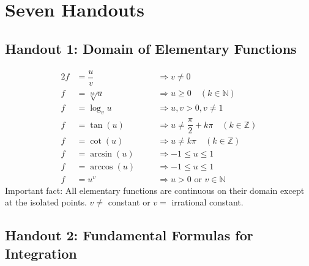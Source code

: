 \chapter*{Seven Handouts}
\section{Handout 1: Domain of Elementary Functions}

\begin{alignat*}{2}
    f &= \dfrac{u}{v} &\quad &\Rightarrow v \neq 0 \\
    f &= \sqrt[2k]{u} &\quad &\Rightarrow u \geq 0 \quad (k \in \mathbb{N}) \\
    f &= \log_{v}{u} &\quad &\Rightarrow u, v > 0, v \neq 1 \\
    f &= \tan(u) &\quad &\Rightarrow u \neq \dfrac{\pi}{2} + k\pi \quad (k \in \mathbb{Z}) \\
    f &= \cot(u) &\quad &\Rightarrow u \neq k\pi \quad (k \in \mathbb{Z}) \\
    f &= \arcsin(u) &\quad &\Rightarrow -1 \leq u \leq 1 \\
    f &= \arccos(u) &\quad &\Rightarrow -1 \leq u \leq 1 \\
    f &= u^v &\quad &\Rightarrow u > 0 \text{ or } v \in \mathbb{N} 
\end{alignat*}
Important fact: All elementary functions are continuous on their domain except at the isolated points.
$v \neq $ constant or $v = $ irrational constant.

\section{Handout 2: Fundamental Formulas for Integration}


